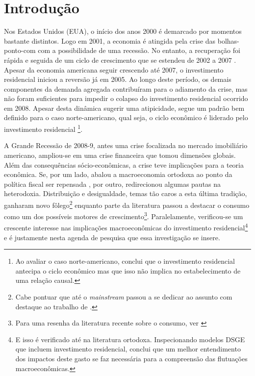 \chapter{Introdução}

Nos Estados Unidos (EUA), o início dos anos 2000 é demarcado por momentos bastante distintos. Logo em 2001, a economia é atingida pela crise das bolhas-ponto-com com a possibilidade de uma recessão. No entanto, a recuperação foi rápida e seguida de um ciclo de crescimento que se estendeu de 2002 a 2007 \cite{cagnin_o_2007}.  Apesar da economia americana seguir crescendo até 2007, o investimento residencial iniciou a reversão já em 2005. Ao longo deste período, os demais componentes da demanda agregada contribuíram para o adiamento da crise, mas não foram suficientes para impedir o colapso do investimento residencial ocorrido em 2008. 
Apesar desta dinâmica sugerir uma atipicidade, segue um padrão bem definido para o caso norte-americano, qual seja, o ciclo econômico é liderado pelo investimento residencial \cites{green_follow_1997}{leamer_housing_2007}{fiebiger_trend_2017}\footnote{
	Ao avaliar o caso norte-americano, \textcite{green_follow_1997} conclui que o investimento residencial antecipa o ciclo econômico mas que isso não implica no estabelecimento de uma relação causal. 
}.

A Grande Recessão de 2008-9, antes uma crise focalizada no mercado imobiliário americano, ampliou-se em uma crise financeira que tomou dimensões globais. Além das consequências sócio-econômicas, a crise teve implicações para a teoria econômica. Se, por um lado, abalou a macroeconomia ortodoxa ao ponto da política fiscal ser repensada \cite{blanchard_rethinking_2017}, por outro, redirecionou algumas pautas na heterodoxia. Distribuição e desigualdade, temas tão caros a esta última tradição, ganharam novo fôlego\footnote{Cabe pontuar que até o \textit{mainstream} passou a se dedicar ao assunto com destaque ao trabalho de \textcite{piketty_o_2014}.} \cites{carvalho_personal_2016}{ederer_will_2019} enquanto parte da literatura passou a destacar o consumo como um dos possíveis motores de crescimento\footnote{Para uma resenha da literatura recente sobre o consumo, ver \textcite{brochier_macroeconomics_2017}}. Paralelamente, verificou-se um crescente interesse nas implicações macroeconômicas do investimento residencial\footnote{E isso é verificado até na literatura ortodoxa. Inspecionando modelos DSGE que incluem investimento residencial, \textcite{iacoviello_housing_2010} conclui que um melhor entendimento dos impactos deste gasto se faz necessária para a compreensão das flutuações macroeconômicas.} \cites{teixeira_crescimento_2015}{fiebiger_semi-autonomous_2018} e é justamente nesta agenda de pesquisa que essa investigação se insere. 

